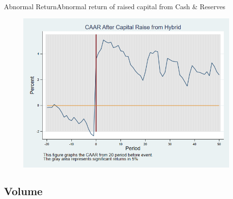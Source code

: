 \documentclass{beamer}
\begin{document}
	\begin{frame}{Abnormal Return}{Abnormal return of raised capital from Cash \& Reserves}
		\label{abreturnhybrid}
		\begin{figure}
			\centering
			\includegraphics[width=0.65\linewidth]{Output/CARHybrid.png}
			\label{fig:abreturnhybrid}
		\end{figure}

	\end{frame}
	
	
	
	\subsection{Volume}
	
\end{document}
